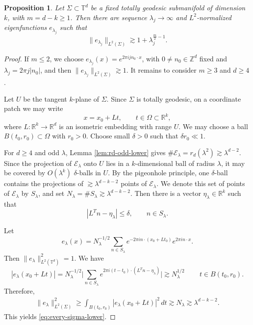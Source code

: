 \documentclass[11pt,reqno]{amsart}
\newtheorem{proposition}[theorem]{Proposition}
\numberwithin{equation}{section}
\newcommand{\1}{\textbf{1}}
\newcommand{\gs}{\gtrsim}
\newcommand{\R}{\mathbb R}
\newcommand{\T}{\mathbb T}
\newcommand{\la}{\lambda}
\newcommand{\dd}{\,d}
\newcommand{\E}{\mathcal{E}}
\begin{document}
	
	\begin{proposition}\label{prop1}
		Let \(\Sigma\subset\mathbb T^d\) be a fixed totally geodesic submanifold of dimension \(k\), with \(m=d-k\ge1\).  Then there are sequence \(\lambda_j\to\infty\) and $L^2$-normalized eigenfunctions \(e_{\lambda_j}\) such that
		\begin{equation}\label{eq:every-sigma-lower}
			\|e_{\lambda_j}\|_{L^2(\Sigma)}
			\gs
			1+\lambda_j^{\frac m2-1}.
		\end{equation} 
	\end{proposition}
	\begin{proof}
		If \(m\le2\),  we choose
		\(e_{\lambda_j}(x)=e^{2\pi ij n_0\cdot x}\), with \(0\neq n_0\in\mathbb Z^d\) fixed
		and \(\lambda_j=2\pi j|n_0|\), and then $\|e_{\lambda_j}\|_{L^2(\Sigma)}\gs 1.$
		It remains to consider \(m\ge3\) and $d\ge4$.
		
		
		Let $U$ be the tangent $k$-plane of $\Sigma$.  Since \(\Sigma\) is totally geodesic, on a coordinate patch we may write
		\[
		x=x_0+Lt,
		\qquad
		t\in\Omega\subset\R^k,
		\]
		where \(L:\R^k\to\R^d\) is an isometric embedding with range \(U\). We may choose a ball $B(t_0,r_0)\subset\Omega$
		with \(r_0>0\).  Choose small \(\delta>0\) such that $\delta r_0\ll1$.  
		
		For \(d\ge4\) and odd \(\lambda\), Lemma \ref{lem:rd-odd-lower} gives \(\#\E_\lambda=r_d(\lambda^2)\gs \lambda^{d-2}\). Since the projection of \(\E_\lambda\) onto $U$ lies in a \(k\)-dimensional ball of radius \(\lambda\), it may be covered by \(O(\lambda^k)\) $\delta$-balls in \(U\). By the pigeonhole principle, one $\delta$-ball contains the projections of \(\gs \la^{d-k-2}\) points of $\E_\la$. We denote this set of points of $\E_\la$ by $S_\la$, and set $N_\la=\# S_\la\gs \la^{d-k-2}$. 
		Then there is a vector \(\eta_\lambda\in\R^k\) such that
		\[
		|L^Tn-\eta_\lambda|\le \delta,
		\qquad n\in S_\lambda.
		\]
		
		Let
		\[
		e_{\lambda}(x)=
		N_\lambda^{-1/2}
		\sum_{n\in S_\lambda}
		e^{-2\pi in\cdot (x_0+Lt_0)}e^{2\pi in\cdot x}.
		\]
		Then $\|e_{\lambda}\|_{L^2(\T^d)}^2
		=1$.
		We have
		\[
		|e_{\lambda}(x_0+Lt)|=N_\lambda^{-1/2}\Big|\sum_{n\in S_\la}e^{2\pi i(t-t_0)\cdot(L^Tn-\eta_\la)}\Big|\gs N_\lambda^{1/2}\,
		\qquad t\in B(t_0,r_0).
		\]
		Therefore,
		\begin{align*}
			\|e_{\lambda}\|_{L^2(\Sigma)}^2\ge
			\int_{B(t_0,r_0)} |e_{\lambda}(x_0+Lt)|^2\dd t \gs N_\la\gs \lambda^{d-k-2}.
		\end{align*}
		This yields \eqref{eq:every-sigma-lower}.
	\end{proof}
	
\end{document}
